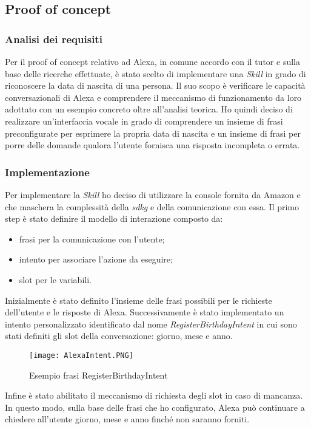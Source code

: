 	\subsection{Proof of concept}
		\subsubsection{Analisi dei requisiti}
		Per il proof of concept relativo ad Alexa, in comune accordo con il tutor e sulla base delle ricerche effettuate, è stato scelto di implementare una \emph{Skill} in grado di riconoscere la data di nascita di una persona. Il suo scopo è verificare le capacità conversazionali di Alexa e comprendere il meccanismo di funzionamento da loro adottato con un esempio concreto oltre all'analisi teorica.
		Ho quindi deciso di realizzare un'interfaccia vocale in grado di comprendere un insieme di frasi preconfigurate per esprimere la propria data di nascita e un insieme di frasi per porre delle domande qualora l'utente fornisca una risposta incompleta o errata.
		\subsubsection{Implementazione}
		Per implementare la \emph{Skill} ho deciso di utilizzare la console fornita da Amazon e che maschera la complessità della \emph{\gls{sdkg}} e della comunicazione con essa. Il primo step è stato definire il modello di interazione composto da:
		\begin{itemize}
			\item frasi per la comunicazione con l'utente;
			\item intento per associare l'azione da eseguire;
			\item slot per le variabili.
		\end{itemize}
		Inizialmente è stato definito l'insieme delle frasi possibili per le richieste dell'utente e le risposte di Alexa. Successivamente è stato implementato un intento personalizzato identificato dal nome \emph{RegisterBirthdayIntent} in cui sono stati definiti gli slot della conversazione: giorno, mese e anno.
		
		\begin{figure}[htbp]
			\begin{center}
				\texttt{[image: AlexaIntent.PNG]}
				\caption{Esempio frasi RegisterBirthdayIntent}
			\end{center}
		\end{figure}
		
		\mbox{}
		Infine è stato abilitato il meccanismo di richiesta degli slot in caso di mancanza. In questo modo, sulla base delle frasi che ho configurato, Alexa può continuare a chiedere all'utente giorno, mese e anno finché non saranno forniti.
		
